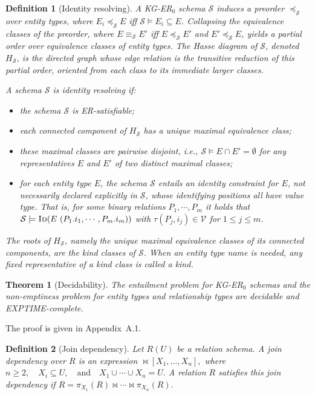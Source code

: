 \documentclass[10pt]{article}
\newtheorem{definition}{Definition}
\newtheorem{theorem}{Theorem}
\begin{document}
\begin{definition}[Identity resolving]
A KG-ER$_0$ schema $\mathcal S$ induces a preorder \(\preceq_{\mathcal S}\)
over entity types, where \(E_i\preceq_{\mathcal S} E\) iff
\(\mathcal S\models E_i\subseteq E\).  Collapsing the equivalence classes
of the preorder, where \(E\equiv_{\mathcal S}E'\) iff
\(E\preceq_{\mathcal S}E'\) and \(E'\preceq_{\mathcal S}E\), yields a
partial order over equivalence classes of entity types.  The Hasse
diagram of $\mathcal S$, denoted \(H_{\mathcal S}\), is the directed
graph whose edge relation is the transitive reduction of this partial
order, oriented from each class to its immediate larger classes.

A schema $\mathcal S$ is identity resolving if:
\begin{itemize}
\item the schema \(\mathcal S\) is ER-satisfiable;
\item each connected component of \(H_{\mathcal S}\) has a unique
maximal equivalence class;
\item these maximal classes are pairwise disjoint, i.e.,
\(\mathcal S\models E\cap E'=\emptyset\) for any representatives \(E\)
and \(E'\) of two distinct maximal classes;
%
\item for each entity type \(E\), the schema \(\mathcal S\) entails an
identity constraint for \(E\), not necessarily declared explicitly in
\(\mathcal S\), whose identifying positions all have value type.  That
is, for some binary relations $P_1,\cdots,P_m$ it holds that
\(\mathcal S\models\textsc{Id}(E\ (P_1.i_1,\cdots,P_m.i_m))\) with
\(\tau(P_j,i_j)\in\mathcal V\) for \(1\leq j\leq m\).
%
\end{itemize}
The roots of \(H_{\mathcal S}\), namely the unique maximal equivalence
classes of its connected components, are the \emph{kind classes} of
\(\mathcal S\).  When an entity type name is needed, any fixed
representative of a kind class is called a \emph{kind}.
\end{definition}

\begin{theorem}[Decidability]
\label{thm:kger-decidability}
The entailment problem for KG-ER$_0$ schemas and the non-emptiness
problem for entity types and relationship types are decidable and
EXPTIME-complete.
\end{theorem}

The proof is given in Appendix~A.1.

\begin{definition}[Join dependency]
Let \(R(U)\) be a relation schema. A \emph{join dependency} over \(R\)
is an expression
\(
\bowtie[X_1,\ldots,X_n],
\)
where
\(
n\geq 2,\quad X_i\subseteq U,\quad\text{and}\quad
X_1\cup\cdots\cup X_n = U.
\)
A relation \(R\) satisfies this join dependency if
\(
R =
\pi_{X_1}(R) \bowtie \cdots \bowtie \pi_{X_n}(R).
\)
\end{definition}
\end{document}
